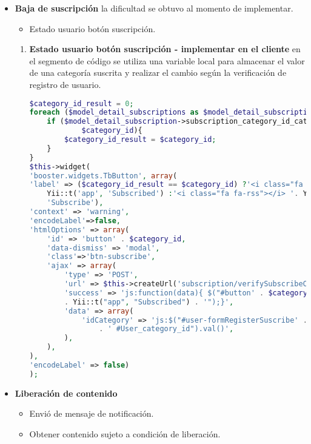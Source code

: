 \begin{itemize}

\item \textbf{Baja de suscripción} la dificultad se obtuvo al momento de implementar.
\begin{itemize}
\item Estado usuario botón suscripción.
\end{itemize}
\begin{enumerate}
\item \textbf{Estado usuario botón suscripción - implementar en el cliente}
en el segmento de código se utiliza una variable local para almacenar el valor
de una categoría suscrita y realizar el cambio según la verificación de registro
de usuario.
\begin{lstlisting}[language=PHP, caption={Cambio de estado botón de suscripción.}]
$category_id_result = 0;
foreach ($model_detail_subscriptions as $model_detail_subscription){
    if ($model_detail_subscription->subscription_category_id_category ==
            $category_id){
        $category_id_result = $category_id;
    }
}
$this->widget(
'booster.widgets.TbButton', array(
'label' => ($category_id_result == $category_id) ?'<i class="fa fa-rss"></i> '.
    Yii::t('app', 'Subscribed') :'<i class="fa fa-rss"></i> '. Yii::t('app', 
    'Subscribe'),
'context' => 'warning',
'encodeLabel'=>false,        
'htmlOptions' => array(
    'id' => 'button' . $category_id,
    'data-dismiss' => 'modal',
    'class'=>'btn-subscribe',
    'ajax' => array(
        'type' => 'POST',
        'url' => $this->createUrl('subscription/verifySubscribeCategory'),
        'success' => 'js:function(data){ $("#button' . $category_id . '").html("'
        . Yii::t("app", "Subscribed") . '");}',
        'data' => array(
            'idCategory' => 'js:$("#user-formRegisterSuscribe' . $category_id 
                . ' #User_category_id").val()',
        ),
    ),
),
'encodeLabel' => false)
);
\end{lstlisting}

\end{enumerate}

\item \textbf{Liberación de contenido}

\begin{itemize}

\item Envió de mensaje de notificación.
\item Obtener contenido sujeto a condición de liberación. 


\end{itemize}
\end{itemize}
